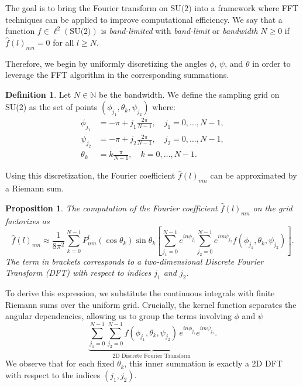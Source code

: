 \documentclass[11pt]{article}
\newtheorem{prop}[thm]{Proposition}
\theoremstyle{definition}
\newtheorem{defn}[thm]{Definition}
\theoremstyle{remark}
\numberwithin{equation}{section}
\begin{document}
The goal is to bring the Fourier transform on $\text{SU(2)}$ into a framework where FFT techniques can be applied to improve computational efficiency. We say that a function $f \in \ell^2(\text{SU(2)})$ is \textit{band-limited} with \textit{band-limit} or \textit{bandwidth} $N \geq 0$ if $\hat{f}(l)_{mn} = 0$ for all $l \geq N$.



Therefore, we begin by uniformly discretizing the angles $\phi$, $\psi$, and $\theta$ in order to leverage the FFT algorithm in the corresponding summations.

\begin{defn}
Let $N \in \mathbb{N}$ be the bandwidth. We define the sampling grid on SU(2) as the set of points $(\phi_{j_1}, \theta_k, \psi_{j_2})$ where:
\begin{align*}
\phi_{j_1} &= -\pi + j_1 \frac{2\pi}{N-1}, \quad j_1 = 0, \dots, N-1, \\
\psi_{j_2} &= -\pi + j_2 \frac{2\pi}{N-1}, \quad j_2 = 0, \dots, N-1, \\
\theta_k &= k \frac{\pi}{N-1}, \quad k = 0, \dots, N-1.
\end{align*}
\end{defn}

Using this discretization, the Fourier coefficient $\hat{f}(l)_{mn}$ can be approximated by a Riemann sum.

\begin{prop}
The computation of the Fourier coefficient $\hat{f}(l)_{mn}$ on the grid factorizes as
\begin{equation}
\hat{f}(l)_{mn} \approx \frac{1}{8\pi^2} \sum_{k=0}^{N-1} P^l_{nm}(\cos\theta_k) \sin\theta_k \left[ \sum_{j_1=0}^{N-1} e^{in\phi_{j_1}} \sum_{j_2=0}^{N-1} e^{im\psi_{j_2}} f(\phi_{j_1}, \theta_k, \psi_{j_2}) \right].
\end{equation}
The term in brackets corresponds to a two-dimensional Discrete Fourier Transform (DFT) with respect to indices $j_1$ and $j_2$.
\end{prop}

To derive this expression, we substitute the continuous integrals with finite Riemann sums over the uniform grid. Crucially, the kernel function separates the angular dependencies, allowing us to group the terms involving $\phi$ and $\psi$
\begin{equation*}
    \underbrace{\sum_{j_1=0}^{N-1} \sum_{j_2=0}^{N-1} f(\phi_{j_1}, \theta_k, \psi_{j_2}) \, e^{in\phi_{j_1}} e^{im\psi_{j_2}}}_{\text{2D Discrete Fourier Transform}}.
\end{equation*}
We observe that for each fixed $\theta_k$, this inner summation is exactly a 2D DFT with respect to the indices $(j_1, j_2)$. 
\end{document}
